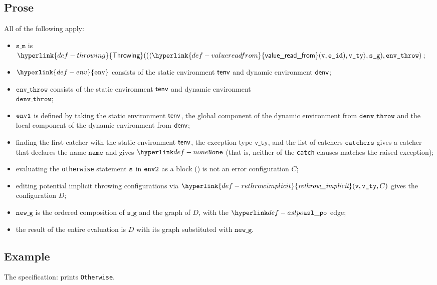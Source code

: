 \documentclass{book}
\newcommand\ErrorConfig[0]{\hyperlink{def-errorconfig}{\texttt{\#DE}}}
\newcommand\ProseOrError[0]{\ProseTerminateAs{\ErrorConfig}}
\newcommand\rethrowimplicit[0]{\hyperlink{def-rethrowimplicit}{\textfunc{rethrow\_implicit}}}
\newcommand\valuereadfrom[0]{\hyperlink{def-valuereadfrom}{\textsf{value\_read\_from}}}
\newcommand\Throwing[0]{\hyperlink{def-throwing}{\textsf{Throwing}}}
\newcommand\env[0]{\hyperlink{def-env}{\texttt{env}}}
\newcommand\newg[0]{\texttt{new\_g}}
\newcommand\name[0]{\texttt{name}}
\newcommand\catchers[0]{\texttt{catchers}}
\newcommand\envthrow[0]{\texttt{env\_throw}}
\newcommand\denvthrow[0]{\texttt{denv\_throw}}
\newcommand\sm[0]{\texttt{s\_m}}
\newcommand\sg[0]{\texttt{s\_g}}
\newcommand\vvty[0]{\texttt{v\_ty}}
\newcommand\eid[0]{\texttt{e\_id}}
\begin{document}
  \subsection{Prose}
  All of the following apply:
  \begin{itemize}
    \item $\sm$ is $\Throwing((\langle \valuereadfrom(\vv, \eid), \vvty \rangle, \sg), \envthrow)$;
    \item $\env$ consists of the static environment $\textsf{tenv}$ and dynamic environment $\textsf{denv}$;
    \item $\envthrow$ consists of the static environment $\textsf{tenv}$ and dynamic environment \\ $\denvthrow$;
    \item $\texttt{env1}$ is defined by taking the static environment $\textsf{tenv}$, the global component of the dynamic
    environment from $\denvthrow$ and the local component of the dynamic environment from $\textsf{denv}$;
    \item finding the first catcher with the static environment $\textsf{tenv}$, the exception type $\vvty$,
    and the list of catchers $\catchers$ gives a catcher that declares the name $\name$ and gives $\None$
    (that is, neither of the \texttt{catch} clauses matches the raised exception);
    \item evaluating the \texttt{otherwise} statement $\texttt{s}$ in $\texttt{env2}$ as a block ()
    is not an error configuration $C$\ProseOrError;
    \item editing potential implicit throwing configurations via $\rethrowimplicit(\vv, \vvty, C)$
    gives the configuration $D$;
    \item $\newg$ is the ordered composition of $\sg$ and the graph of $D$,
    with the $\aslpo$ edge;
    \item the result of the entire evaluation is $D$ with its graph substituted with $\newg$.
  \end{itemize}

    \subsection{Example}
     The specification:
     prints \texttt{Otherwise}.

\end{document}

